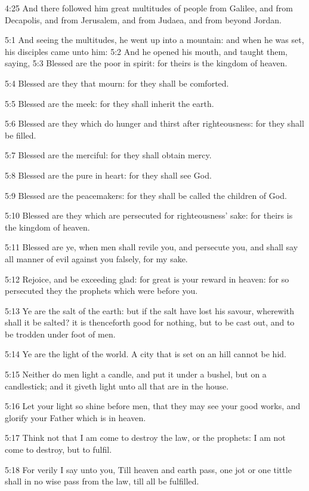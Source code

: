 4:25 And there followed him great multitudes of people from Galilee, and from Decapolis, and from Jerusalem, and from Judaea, and from beyond Jordan.

5:1 And seeing the multitudes, he went up into a mountain: and when he was set, his disciples came unto him: 5:2 And he opened his mouth, and taught them, saying, 5:3 Blessed are the poor in spirit: for theirs is the kingdom of heaven.

5:4 Blessed are they that mourn: for they shall be comforted.

5:5 Blessed are the meek: for they shall inherit the earth.

5:6 Blessed are they which do hunger and thirst after righteousness: for they shall be filled.

5:7 Blessed are the merciful: for they shall obtain mercy.

5:8 Blessed are the pure in heart: for they shall see God.

5:9 Blessed are the peacemakers: for they shall be called the children of God.

5:10 Blessed are they which are persecuted for righteousness' sake: for theirs is the kingdom of heaven.

5:11 Blessed are ye, when men shall revile you, and persecute you, and shall say all manner of evil against you falsely, for my sake.

5:12 Rejoice, and be exceeding glad: for great is your reward in heaven: for so persecuted they the prophets which were before you.

5:13 Ye are the salt of the earth: but if the salt have lost his savour, wherewith shall it be salted? it is thenceforth good for nothing, but to be cast out, and to be trodden under foot of men.

5:14 Ye are the light of the world. A city that is set on an hill cannot be hid.

5:15 Neither do men light a candle, and put it under a bushel, but on a candlestick; and it giveth light unto all that are in the house.

5:16 Let your light so shine before men, that they may see your good works, and glorify your Father which is in heaven.

5:17 Think not that I am come to destroy the law, or the prophets: I am not come to destroy, but to fulfil.

5:18 For verily I say unto you, Till heaven and earth pass, one jot or one tittle shall in no wise pass from the law, till all be fulfilled.

